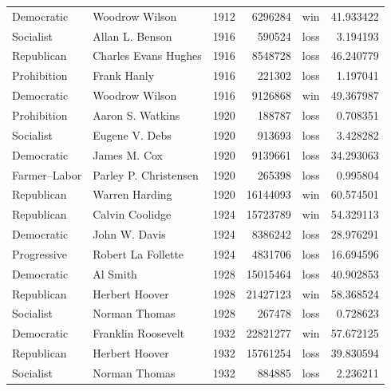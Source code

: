 \documentclass[
  letterpaper,
  DIV=11,
  numbers=noendperiod]{scrreprt}
\begin{document}
\begin{tabular}{llrrlr}
Democratic            &          Woodrow Wilson &  1912 &       6296284 &    win &  41.933422 \\
Socialist             &         Allan L. Benson &  1916 &        590524 &   loss &   3.194193 \\
Republican            &    Charles Evans Hughes &  1916 &       8548728 &   loss &  46.240779 \\
Prohibition           &             Frank Hanly &  1916 &        221302 &   loss &   1.197041 \\
Democratic            &          Woodrow Wilson &  1916 &       9126868 &    win &  49.367987 \\
Prohibition           &        Aaron S. Watkins &  1920 &        188787 &   loss &   0.708351 \\
Socialist             &          Eugene V. Debs &  1920 &        913693 &   loss &   3.428282 \\
Democratic            &            James M. Cox &  1920 &       9139661 &   loss &  34.293063 \\
Farmer–Labor          &   Parley P. Christensen &  1920 &        265398 &   loss &   0.995804 \\
Republican            &          Warren Harding &  1920 &      16144093 &    win &  60.574501 \\
Republican            &         Calvin Coolidge &  1924 &      15723789 &    win &  54.329113 \\
Democratic            &           John W. Davis &  1924 &       8386242 &   loss &  28.976291 \\
Progressive           &      Robert La Follette &  1924 &       4831706 &   loss &  16.694596 \\
Democratic            &                Al Smith &  1928 &      15015464 &   loss &  40.902853 \\
Republican            &          Herbert Hoover &  1928 &      21427123 &    win &  58.368524 \\
Socialist             &           Norman Thomas &  1928 &        267478 &   loss &   0.728623 \\
Democratic            &      Franklin Roosevelt &  1932 &      22821277 &    win &  57.672125 \\
Republican            &          Herbert Hoover &  1932 &      15761254 &   loss &  39.830594 \\
Socialist             &           Norman Thomas &  1932 &        884885 &   loss &   2.236211 \\

\end{tabular}
\end{document}
